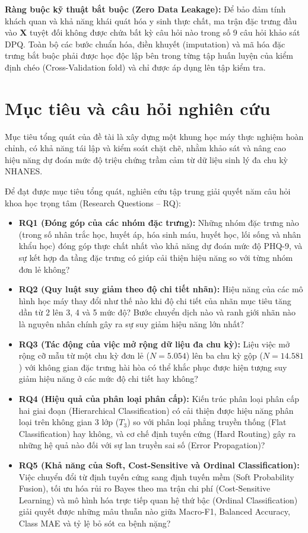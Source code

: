\textbf{Ràng buộc kỹ thuật bắt buộc (Zero Data Leakage):} Để bảo đảm tính khách quan và khả năng khái quát hóa y sinh thực chất, ma trận đặc trưng đầu vào $\mathbf{X}$ tuyệt đối không được chứa bất kỳ câu hỏi nào trong số 9 câu hỏi khảo sát DPQ. Toàn bộ các bước chuẩn hóa, điền khuyết (imputation) và mã hóa đặc trưng bắt buộc phải được học độc lập bên trong từng tập huấn luyện của kiểm định chéo (Cross-Validation fold) và chỉ được áp dụng lên tập kiểm tra.

\section{Mục tiêu và câu hỏi nghiên cứu}
\label{sec:muc-tieu-va-cau-hoi}

Mục tiêu tổng quát của đề tài là xây dựng một khung học máy thực nghiệm hoàn chỉnh, có khả năng tái lập và kiểm soát chặt chẽ, nhằm khảo sát và nâng cao hiệu năng dự đoán mức độ triệu chứng trầm cảm từ dữ liệu sinh lý đa chu kỳ NHANES. 

Để đạt được mục tiêu tổng quát, nghiên cứu tập trung giải quyết năm câu hỏi khoa học trọng tâm (Research Questions -- RQ):
\begin{itemize}
    \item \textbf{RQ1 (Đóng góp của các nhóm đặc trưng):} Những nhóm đặc trưng nào (trong số nhân trắc học, huyết áp, hóa sinh máu, huyết học, lối sống và nhân khẩu học) đóng góp thực chất nhất vào khả năng dự đoán mức độ PHQ-9, và sự kết hợp đa tầng đặc trưng có giúp cải thiện hiệu năng so với từng nhóm đơn lẻ không?
    \item \textbf{RQ2 (Quy luật suy giảm theo độ chi tiết nhãn):} Hiệu năng của các mô hình học máy thay đổi như thế nào khi độ chi tiết của nhãn mục tiêu tăng dần từ 2 lên 3, 4 và 5 mức độ? Bước chuyển dịch nào và ranh giới nhãn nào là nguyên nhân chính gây ra sự suy giảm hiệu năng lớn nhất?
    \item \textbf{RQ3 (Tác động của việc mở rộng dữ liệu đa chu kỳ):} Liệu việc mở rộng cỡ mẫu từ một chu kỳ đơn lẻ ($N = 5.054$) lên ba chu kỳ gộp ($N = 14.581$) với không gian đặc trưng hài hòa có thể khắc phục được hiện tượng suy giảm hiệu năng ở các mức độ chi tiết hay không?
    \item \textbf{RQ4 (Hiệu quả của phân loại phân cấp):} Kiến trúc phân loại phân cấp hai giai đoạn (Hierarchical Classification) có cải thiện được hiệu năng phân loại trên không gian 3 lớp ($T_3$) so với phân loại phẳng truyền thống (Flat Classification) hay không, và cơ chế định tuyến cứng (Hard Routing) gây ra những hệ quả nào đối với sự lan truyền sai số (Error Propagation)?
    \item \textbf{RQ5 (Khả năng của Soft, Cost-Sensitive và Ordinal Classification):} Việc chuyển đổi từ định tuyến cứng sang định tuyến mềm (Soft Probability Fusion), tối ưu hóa rủi ro Bayes theo ma trận chi phí (Cost-Sensitive Learning) và mô hình hóa trực tiếp quan hệ thứ bậc (Ordinal Classification) giải quyết được những mâu thuẫn nào giữa Macro-F1, Balanced Accuracy, Class MAE và tỷ lệ bỏ sót ca bệnh nặng?
\end{itemize}

